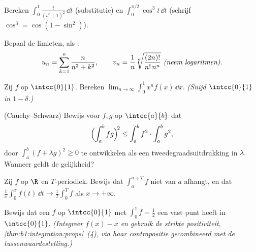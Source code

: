 \begin{exercise}[$\star$]\label{exo:b1:integration:2}
Bereken $\displaystyle\int_0^{1} \frac{t}{(t^2+1)^2}\,\dd t$
(substitutie) en $\displaystyle\int_0^{\pi/2} \cos^3 t\, \dd t$
(schrijf $\cos^3 = \cos(1 - \sin^2)$).
\end{exercise}

\begin{exercise}[$\star$]\label{exo:b1:integration:3}
Bepaal de limieten, als :
\[
u_n = \sum_{k=1}^{n} \frac{n}{n^2 + k^2},
\qquad
v_n = \frac{1}{n}\sqrt[n]{\frac{(2n)!}{n!\,n^n}}
\ \emph{(neem logaritmen)}.
\]
\end{exercise}

\begin{exercise}[$\star$]\label{exo:b1:integration:4}
Zij $f$  op $\intcc{0}{1}$. Bereken $\lim_{n\to\infty}
\int_0^1 x^n f(x)\,\dd x$. \emph{(Snijd $\intcc{0}{1}$ in $1 -
\delta$.)}
\end{exercise}

\begin{exercise}[$\star\star$]\label{exo:b1:integration:5}
(Cauchy--Schwarz) Bewijs voor $f, g$  op $\intcc{a}{b}$ dat
\[
\Bigl(\int_a^b fg\Bigr)^{\!2} \leq \int_a^b f^2 \cdot \int_a^b g^2 ,
\]
door $\int_a^b (f + \lambda g)^2 \geq 0$ te ontwikkelen als een
tweedegraadsuitdrukking in $\lambda$. Wanneer geldt de gelijkheid?
\end{exercise}

\begin{exercise}[$\star\star$]\label{exo:b1:integration:6}
Zij $f$  op $\R$ en $T$-periodiek. Bewijs dat $\int_a^{a+T}
f$ niet van $a$ afhangt, en dat $\frac1x \int_0^x f(t)\,\dd t \to
\frac 1T \int_0^T f$ als $x \to +\infty$.
\end{exercise}

\begin{exercise}[$\star\star$]\label{exo:b1:integration:7}
Bewijs dat een  $f$ op $\intcc{0}{1}$ met $\int_0^1 f =
\frac12$ een vast punt heeft in $\intcc{0}{1}$. \emph{(Integreer
$f(x) - x$ en gebruik de strikte positiviteit,
\cref{thm:b1:integration:props}~(4), via haar contrapositie
gecombineerd met de tussenwaardestelling.)}
\end{exercise}

